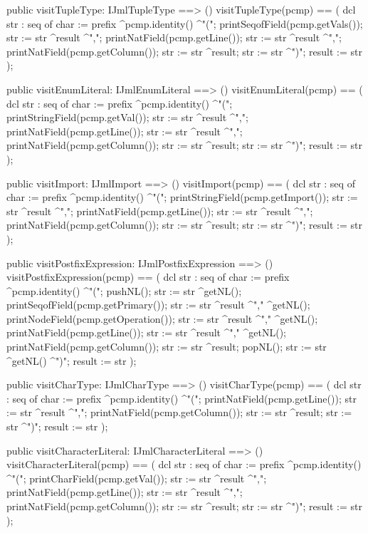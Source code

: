 \begin{vdm_al}
  public visitTupleType: IJmlTupleType ==> ()
  visitTupleType(pcmp) ==
    ( dcl str : seq of char := prefix ^pcmp.identity() ^"(";
      printSeqofField(pcmp.getVals());
      str := str ^result ^",";
      printNatField(pcmp.getLine());
      str := str ^result ^",";
      printNatField(pcmp.getColumn());
      str := str ^result;
      str := str ^")";
      result := str );

  public visitEnumLiteral: IJmlEnumLiteral ==> ()
  visitEnumLiteral(pcmp) ==
    ( dcl str : seq of char := prefix ^pcmp.identity() ^"(";
      printStringField(pcmp.getVal());
      str := str ^result ^",";
      printNatField(pcmp.getLine());
      str := str ^result ^",";
      printNatField(pcmp.getColumn());
      str := str ^result;
      str := str ^")";
      result := str );

  public visitImport: IJmlImport ==> ()
  visitImport(pcmp) ==
    ( dcl str : seq of char := prefix ^pcmp.identity() ^"(";
      printStringField(pcmp.getImport());
      str := str ^result ^",";
      printNatField(pcmp.getLine());
      str := str ^result ^",";
      printNatField(pcmp.getColumn());
      str := str ^result;
      str := str ^")";
      result := str );

  public visitPostfixExpression: IJmlPostfixExpression ==> ()
  visitPostfixExpression(pcmp) ==
    ( dcl str : seq of char := prefix ^pcmp.identity() ^"(";
      pushNL();
      str := str ^getNL();
      printSeqofField(pcmp.getPrimary());
      str := str ^result ^"," ^getNL();
      printNodeField(pcmp.getOperation());
      str := str ^result ^"," ^getNL();
      printNatField(pcmp.getLine());
      str := str ^result ^"," ^getNL();
      printNatField(pcmp.getColumn());
      str := str ^result;
      popNL();
      str := str ^getNL() ^")";
      result := str );

  public visitCharType: IJmlCharType ==> ()
  visitCharType(pcmp) ==
    ( dcl str : seq of char := prefix ^pcmp.identity() ^"(";
      printNatField(pcmp.getLine());
      str := str ^result ^",";
      printNatField(pcmp.getColumn());
      str := str ^result;
      str := str ^")";
      result := str );

  public visitCharacterLiteral: IJmlCharacterLiteral ==> ()
  visitCharacterLiteral(pcmp) ==
    ( dcl str : seq of char := prefix ^pcmp.identity() ^"(";
      printCharField(pcmp.getVal());
      str := str ^result ^",";
      printNatField(pcmp.getLine());
      str := str ^result ^",";
      printNatField(pcmp.getColumn());
      str := str ^result;
      str := str ^")";
      result := str );


\end{vdm_al}
